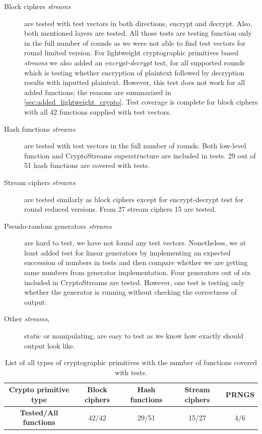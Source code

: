 \documentclass[
    digital,    %
    oneside,    %
    color,
    11pt,
    nocover,
    notable,
    nolof,
    nolot,
    final
]{fithesis3}
\renewcommand\_{\textunderscore\allowbreak}
\begin{document}
\begin{description}
	\item[Block ciphers \textit{streams}] are tested with test vectors in both directions, encrypt and decrypt. Also, both mentioned layers are tested. All those tests are testing function only in the full number of rounds as we were not able to find test vectors for round limited version. For lightweight cryptographic primitives based \textit{streams} we also added an \textit{encrypt-decrypt} test, for all supported rounds which is testing whether encryption of plaintext followed by decryption results with inputted plaintext. However, this test does not work for all added functions; the reasons are summarized in \cref{sec:added_lightweight_crypto}. Test coverage is complete for block ciphers with all 42 functions supplied with test vectors.
	
	\item[Hash functions \textit{streams}] are tested with test vectors in the full number of rounds. Both low-level function and CryptoStreams superstructure are included in tests. 29 out of 51 hash functions are covered with tests.
	
	\item[Stream ciphers \textit{streams}] are tested similarly as block ciphers except for encrypt-decrypt test for round reduced versions. From 27 stream ciphers 15 are tested.
	
	\item[Pseudo-random generators \textit{streams}] are hard to test, we have not found any test vectors. Nonetheless, we at least added test for linear generators by implementing an expected succession of numbers in tests and then compare whether we are getting same numbers from generator implementation. Four generators out of six included in CryptoStreams are tested. However, one test is testing only whether the generator is running without checking the correctness of output.
	
	\item[Other \textit{streams},] static or manipulating, are easy to test as we know how exactly should output look like.
	 
\end{description}
\begin{table}[t]
	\centering	
	\begin{tabular}{c|c c c c}
		\textbf{\large Crypto primitive type} &  Block ciphers &  Hash functions &  Stream ciphers &  PRNGS  \\ \hline
		\textbf{\large Tested/All functions} & 42/42	&	29/51		&		15/27	&		4/6	\\
		
	\end{tabular}
	\caption{List of all types of cryptographic primitives with the number of functions covered with tests.}
	\label{table:tested-cryptoprimitives}
\end{table}
\end{document}
